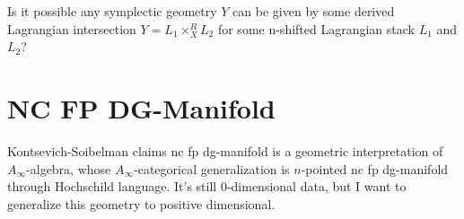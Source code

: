 \documentclass{article}
\begin{document}
\begin{question}{}{}
Is it possible any symplectic geometry $Y$ can be given by some derived Lagrangian intersection $Y= L_1 \times_X^R L_2$
for some n-shifted Lagrangian stack $L_1$ and $L_2$?
\end{question}



\begin{definition}{}{}
\end{definition}


\section{NC FP DG-Manifold}

\noindent
Kontsevich-Soibelman claims nc fp dg-manifold is a geometric interpretation of $A_\infty$-algebra,
whose $A_\infty$-categorical generalization is $n$-pointed nc fp dg-manifold through Hochschild language.
It's still $0$-dimensional data, but I want to generalize this geometry to positive dimensional. 






\nocite{*}
\printbibliography
\end{document}

